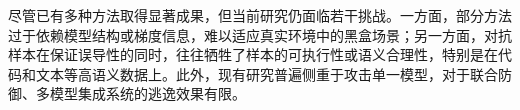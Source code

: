 
尽管已有多种方法取得显著成果，但当前研究仍面临若干挑战。一方面，部分方法过于依赖模型结构或梯度信息，难以适应真实环境中的黑盒场景；另一方面，对抗样本在保证误导性的同时，往往牺牲了样本的可执行性或语义合理性，特别是在代码和文本等高语义数据上。此外，现有研究普遍侧重于攻击单一模型，对于联合防御、多模型集成系统的逃逸效果有限。


